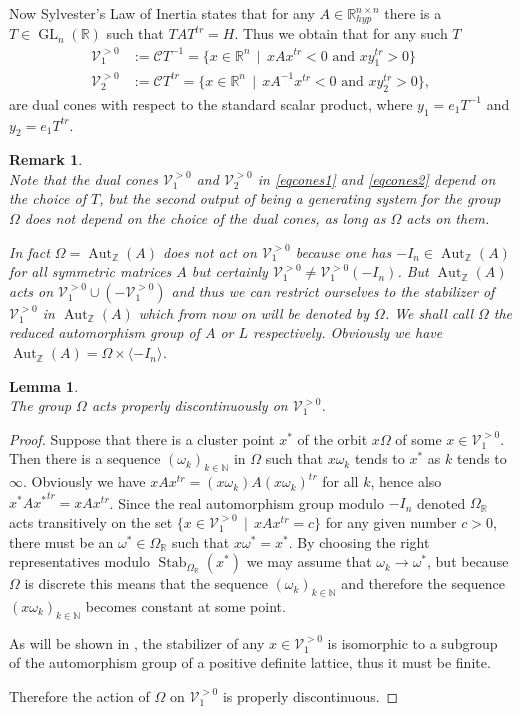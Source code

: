 \documentclass[10pt, preprint]{elsarticle}
\newtheorem{lemma}[theorem]{Lemma}
\newtheorem{remark}[theorem]{Remark}
\theoremstyle{definition}
\theoremstyle{definition}
\newcommand{\N}{\mathbb{N}}
\newcommand{\Z}{\mathbb{Z}}
\newcommand{\R}{\mathbb{R}}
\newcommand{\calC}{\mathcal{C}}
\newcommand{\V}{\mathcal{V}}
\newcommand{\w}{\omega}
\newcommand{\Rhyp}{\R^{n\times n}_{hyp}}
\newcommand{\Aut}{\operatorname{Aut}}
\newcommand{\Stab}{\operatorname{Stab}}
\newcommand{\GL}{\operatorname{GL}}
\newcommand{\Vgt}{\V_1^{>0}}
\newcommand{\Wgt}{\V_2^{>0}}
\begin{document}
Now Sylvester's Law of Inertia states that for any $A\in\Rhyp$ there is a $T\in\GL_n(\R)$ such that $TAT^{tr}=H$. Thus we obtain that for any such $T$
\begin{align}
\Vgt&:=\calC T^{-1}=\{x\in\R^n\,\mid\, xAx^{tr}<0 \text{ and }xy_1^{tr}>0\}\label{eqcones1}\\
\Wgt&:=\calC T^{tr}=\{x\in\R^n\,\mid\, xA^{-1}x^{tr}<0 \text{ and }xy_2^{tr}>0\}\label{eqcones2},
\end{align}
are dual cones with respect to the standard scalar product, where $y_1=e_1T^{-1}$ and $y_2=e_1T^{tr}$.
\begin{remark}\mbox{}\\
Note that the dual cones $\Vgt$ and $\Wgt$ in \eqref{eqcones1} and \eqref{eqcones2} depend on the choice of $T$, but the second output of  being a generating system for the group $\Omega$ does not depend on the choice of the dual cones, as long as $\Omega$ acts on them. 

In fact $\Omega=\Aut_\Z(A)$ does \emph{not} act on $\Vgt$ because one has $-I_n\in\Aut_\Z(A)$ for all symmetric matrices $A$ but certainly $\Vgt\neq\Vgt (-I_n)$. But $\Aut_\Z(A)$ acts on $\Vgt\cup(-\Vgt)$ and thus we can restrict ourselves to the stabilizer of $\Vgt$ in $\Aut_\Z(A)$ which from now on will be denoted by $\Omega$. We shall call $\Omega$ the \emph{reduced} automorphism group of $A$ or $L$ respectively. Obviously we have $\Aut_\Z(A)=\Omega\times\langle -I_n\rangle$.
\end{remark}
\begin{lemma}\mbox{}\\
The group $\Omega$ acts properly discontinuously on $\Vgt$.
\end{lemma}
\begin{proof}
Suppose that there is a cluster point $x^*$ of the orbit $x\Omega$ of some $x\in\Vgt$. Then there is a sequence $(\w_k)_{k\in\N}$ in $\Omega$ such that $x\omega_k$ tends to $x^*$ as $k$ tends to $\infty$. Obviously we have $xAx^{tr}=(x\w_k)A(x\w_k)^{tr}$ for all $k$, hence also $x^*A{x^*}^{tr}=xAx^{tr}$. Since the real automorphism group modulo $-I_n$ denoted $\Omega_\R$ acts transitively on the set $\{x\in\Vgt\,\mid\,xAx^{tr}=c\}$ for any given number $c>0$, there must be an $\omega^*\in\Omega_\R$ such that $x\w^*=x^*$. By choosing the right representatives modulo $\Stab_{\Omega_\R}(x^*)$ we may assume that $\omega_k\rightarrow \omega^*$, but because $\Omega$ is discrete this means that the sequence $(\w_k)_{k\in\N}$ and therefore the sequence $(x\w_k)_{k\in \N}$ becomes constant at some point.

As will be shown in , the stabilizer of any $x\in\Vgt$ is isomorphic to a subgroup of the automorphism group of a positive definite lattice, thus it must be finite.

Therefore the action of $\Omega$ on $\Vgt$ is properly discontinuous. 
\end{proof}
\end{document}
